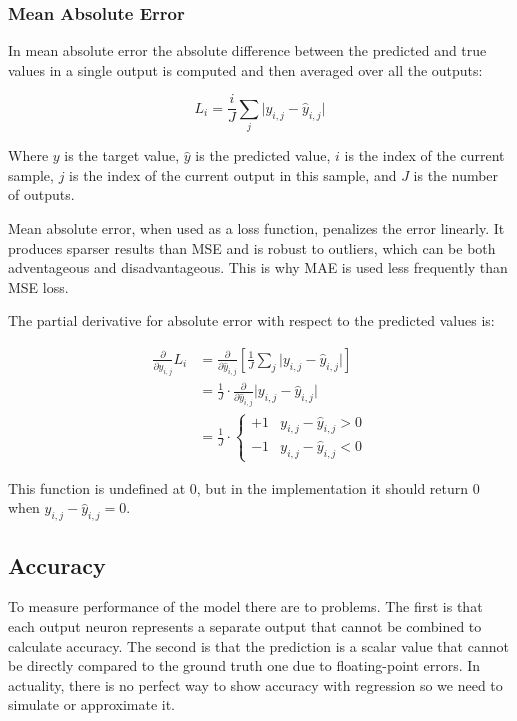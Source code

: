 \documentclass[a4paper]{report}
\newcommand{\abs}[1]{\lvert#1\rvert}
\begin{document}
\subsubsection*{Mean Absolute Error}
In mean absolute error the absolute difference between the predicted and true values in a single output is computed and then averaged over all the outputs:

\begin{equation*}
    L_i = \frac{i}{J}\sum_j\abs{y_{i,j}-\hat{y}_{i,j}}
\end{equation*}

Where $y$ is the target value, $\hat{y}$ is the predicted value, $i$ is the index of the current sample, $j$ is the index of the current output in this sample, and $J$ is the number of outputs.

Mean absolute error, when used as a loss function, penalizes the error linearly. It produces sparser results than MSE and is robust to outliers, which can be both adventageous and disadvantageous. This is why MAE is used less frequently than MSE loss.

The partial derivative for absolute error with respect to the predicted values is:

\begin{align*}
    \frac{\partial}{\partial\hat{y}_{i,j}}L_i &= \frac{\partial}{\partial\hat{y}_{i,j}} \left[ \frac{1}{J}\sum_j\abs{y_{i,j}-\hat{y}_{i,j}} \right] \\
    &= \frac{1}{J} \cdot \frac{\partial}{\partial\hat{y}_{i,j}}\abs{y_{i,j}-\hat{y}_{i,j}} \\
    &= \frac{1}{J} \cdot \begin{cases}
        +1 & y_{i,j} - \hat{y}_{i,j} > 0 \\
        -1 & y_{i,j} - \hat{y}_{i,j} < 0
    \end{cases}
\end{align*}

This function is undefined at 0, but in the implementation it should return 0 when $y_{i,j} - \hat{y}_{i,j} = 0$.

\subsection*{Accuracy}
To measure performance of the model there are to problems. The first is that each output neuron represents a separate output that cannot be combined to calculate accuracy. The second is that the prediction is a scalar value that cannot be directly compared to the ground truth one due to floating-point errors. In actuality, there is no perfect way to show accuracy with regression so we need to simulate or approximate it.
\end{document}
